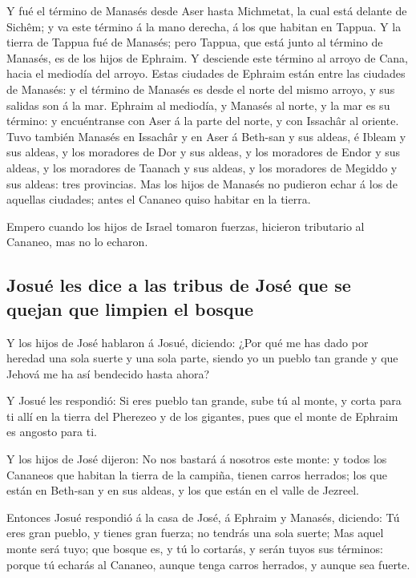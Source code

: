  Y fué el término de Manasés desde Aser hasta Michmetat, la
cual está delante de Sichêm; y va este término á la mano derecha, á los
que habitan en Tappua.  Y la tierra de Tappua fué de
Manasés; pero Tappua, que está junto al término de Manasés, es de los
hijos de Ephraim.  Y desciende este término al arroyo de
Cana, hacia el mediodía del arroyo. Estas ciudades de Ephraim están
entre las ciudades de Manasés: y el término de Manasés es desde el norte
del mismo arroyo, y sus salidas son á la mar.  Ephraim al
mediodía, y Manasés al norte, y la mar es su término: y encuéntranse con
Aser á la parte del norte, y con Issachâr al oriente.  Tuvo
también Manasés en Issachâr y en Aser á Beth-san y sus aldeas, é Ibleam
y sus aldeas, y los moradores de Dor y sus aldeas, y los moradores de
Endor y sus aldeas, y los moradores de Taanach y sus aldeas, y los
moradores de Megiddo y sus aldeas: tres provincias.  Mas
los hijos de Manasés no pudieron echar á los de aquellas ciudades; antes
el Cananeo quiso habitar en la tierra.

 Empero cuando los hijos de Israel tomaron fuerzas,
hicieron tributario al Cananeo, mas no lo echaron.

\hypertarget{josuuxe9-les-dice-a-las-tribus-de-josuxe9-que-se-quejan-que-limpien-el-bosque}{%
\subsection{Josué les dice a las tribus de José que se quejan que
limpien el
bosque}\label{josuuxe9-les-dice-a-las-tribus-de-josuxe9-que-se-quejan-que-limpien-el-bosque}}

 Y los hijos de José hablaron á Josué, diciendo: ¿Por qué
me has dado por heredad una sola suerte y una sola parte, siendo yo un
pueblo tan grande y que Jehová me ha así bendecido hasta ahora?

 Y Josué les respondió: Si eres pueblo tan grande, sube tú
al monte, y corta para ti allí en la tierra del Pherezeo y de los
gigantes, pues que el monte de Ephraim es angosto para ti.

 Y los hijos de José dijeron: No nos bastará á nosotros
este monte: y todos los Cananeos que habitan la tierra de la campiña,
tienen carros herrados; los que están en Beth-san y en sus aldeas, y los
que están en el valle de Jezreel.

 Entonces Josué respondió á la casa de José, á Ephraim y
Manasés, diciendo: Tú eres gran pueblo, y tienes gran fuerza; no tendrás
una sola suerte;  Mas aquel monte será tuyo; que bosque es,
y tú lo cortarás, y serán tuyos sus términos: porque tú echarás al
Cananeo, aunque tenga carros herrados, y aunque sea fuerte.


